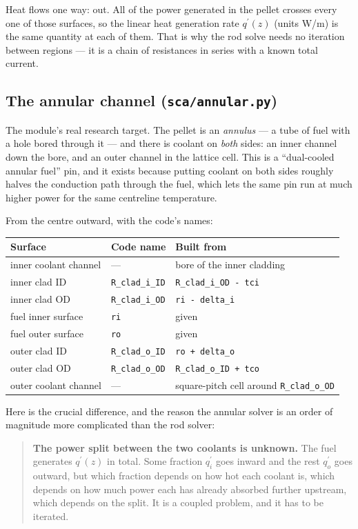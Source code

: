 \documentclass[11pt]{article}
\newcommand{\code}[1]{\texttt{#1}}
\newcommand{\qp}{q^{\prime}}
\begin{document}
Heat flows one way: out. All of the power generated in the pellet crosses every one of
those surfaces, so the linear heat generation rate $\qp(z)$ (units W/m) is the same
quantity at each of them. That is why the rod solve needs no iteration between regions
--- it is a chain of resistances in series with a known total current.

\subsection{The annular channel (\code{sca/annular.py})}

The module's real research target. The pellet is an \emph{annulus} --- a tube of fuel
with a hole bored through it --- and there is coolant on \emph{both} sides: an inner
channel down the bore, and an outer channel in the lattice cell. This is a
``dual-cooled annular fuel'' pin, and it exists because putting coolant on both sides
roughly halves the conduction path through the fuel, which lets the same pin run at
much higher power for the same centreline temperature.

From the centre outward, with the code's names:

\begin{center}
\begin{tabular}{lll}
\toprule
Surface & Code name & Built from \\
\midrule
inner coolant channel & --- & bore of the inner cladding \\
inner clad ID & \code{R\_clad\_i\_ID} & \code{R\_clad\_i\_OD - tci} \\
inner clad OD & \code{R\_clad\_i\_OD} & \code{ri - delta\_i} \\
fuel inner surface & \code{ri} & given \\
fuel outer surface & \code{ro} & given \\
outer clad ID & \code{R\_clad\_o\_ID} & \code{ro + delta\_o} \\
outer clad OD & \code{R\_clad\_o\_OD} & \code{R\_clad\_o\_ID + tco} \\
outer coolant channel & --- & square-pitch cell around \code{R\_clad\_o\_OD} \\
\bottomrule
\end{tabular}
\end{center}

Here is the crucial difference, and the reason the annular solver is an order of
magnitude more complicated than the rod solver:

\begin{quote}
\textbf{The power split between the two coolants is unknown.} The fuel generates
$\qp(z)$ in total. Some fraction $\qp_i$ goes inward and the rest $\qp_o$ goes outward,
but which fraction depends on how hot each coolant is, which depends on how much power
each has already absorbed further upstream, which depends on the split. It is a coupled
problem, and it has to be iterated.
\end{quote}
\end{document}
